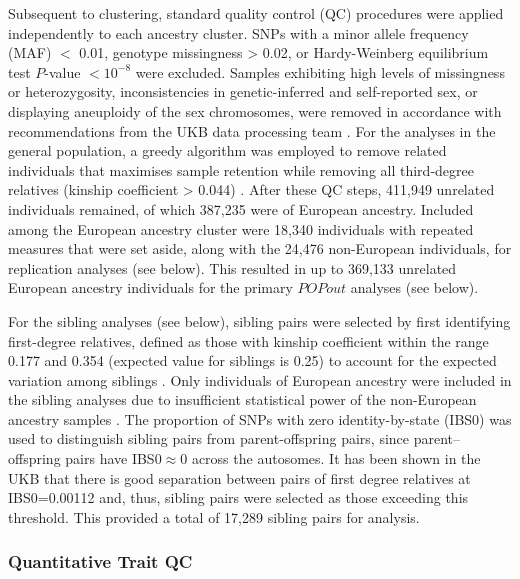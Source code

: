 \documentclass[12pt]{zHenriquesLab-StyleBioRxiv}
\begin{document}
Subsequent to clustering, standard quality control (QC) procedures
were applied independently to each ancestry cluster. SNPs with a minor
allele frequency (MAF) $<$ 0.01, genotype missingness > 0.02, or
Hardy-Weinberg equilibrium test $P$-value $< 10^{-8}$ were
excluded. Samples exhibiting high levels of missingness or
heterozygosity, inconsistencies in genetic-inferred and self-reported
sex, or displaying aneuploidy of the sex chromosomes, were removed in
accordance with recommendations from the UKB data processing team
\citep{ukb_qc}.  For the analyses in the general population, a greedy
algorithm was employed to remove related individuals that maximises
sample retention while removing all third-degree relatives (kinship
coefficient > 0.044) \citep{erase}.  After these QC steps, 411,949 unrelated    %
individuals remained, of which 387,235 were of European ancestry. Included 
among the European ancestry cluster were 18,340 individuals with repeated 
measures that were set aside, along with the 24,476 non-European individuals, 
for replication analyses (see below). This resulted in up to 369,133 unrelated 
European ancestry individuals for the primary $POPout$ analyses (see below). 

For the sibling analyses (see below), sibling pairs were selected by first
identifying first-degree relatives, defined as those with kinship
coefficient within the range 0.177 and 0.354 (expected value for
siblings is 0.25) to account for the expected variation among siblings \citep{sib1}. 
Only individuals of European ancestry were included in the sibling analyses due to 
insufficient statistical power of the non-European ancestry samples \citep{Souaiaia2024}. 
The proportion of SNPs with zero identity-by-state (IBS0) was used to distinguish 
sibling pairs from parent-offspring pairs, since parent–offspring pairs have
IBS0$\approx$0 across the autosomes. It has been shown in the UKB that
there is good separation between pairs of first degree relatives at
IBS0=0.00112 \citep{sib1} and, thus, sibling pairs were selected as
those exceeding this threshold. This provided a total of 17,289 sibling pairs 
for analysis.

\subsubsection*{Quantitative Trait QC} \label{sec:methods:traitQC} 
\end{document}
